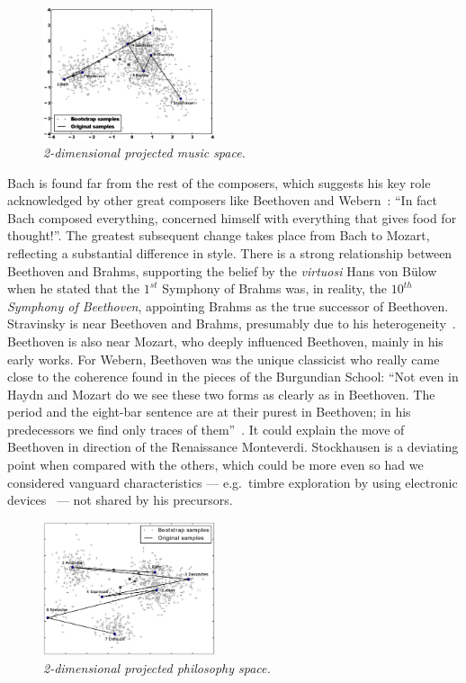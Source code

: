 \documentclass[
 aip,
 jmp,
 amsmath,amssymb,
 reprint,
]{revtex4-1}
\begin{document}
\begin{figure}[htbp]
  \begin{center}
    \includegraphics[width=0.45\textwidth]{g1}
  \end{center}
  \caption{\it 2-dimensional projected music space.}
  \label{fig:pcamus}
\end{figure}

Bach is found far from the rest of the composers, which suggests his
key role acknowledged by other great composers like Beethoven and
Webern~\cite{Webern}: ``In fact Bach composed everything, concerned
himself with everything that gives food for thought!''. The greatest
subsequent change takes place from Bach to Mozart, reflecting a
substantial difference in style. There is a strong relationship
between Beethoven and Brahms, supporting the belief by the
\textit{virtuosi} Hans von B\"{u}low~\cite{Bulow} when he stated that
the $1^{st}$ Symphony of Brahms was, in reality, the \textit{$10^{th}$
  Symphony of Beethoven}, appointing Brahms as the true successor of
Beethoven. Stravinsky is near Beethoven and Brahms, presumably due to
his heterogeneity~\cite{BennettHistory, Lovelock}. Beethoven is also
near Mozart, who deeply influenced Beethoven, mainly in his early
works. For Webern, Beethoven was the unique classicist who really came
close to the coherence found in the pieces of the Burgundian School:
``Not even in Haydn and Mozart do we see these two forms as clearly as
in Beethoven. The period and the eight-bar sentence are at their
purest in Beethoven; in his predecessors we find only traces of
them''~\cite{Webern}. It could explain the move of Beethoven in
direction of the Renaissance Monteverdi. Stockhausen is a deviating
point when compared with the others, which could be more even so had
we considered vanguard characteristics --- e.g.\ timbre exploration by
using electronic devices~\cite{Lovelock} --- not shared by his
precursors.

\begin{figure}
  \begin{center}
    \includegraphics[width=0.45\textwidth]{pca_filosofos_novo}
  \end{center}
  \caption{\it 2-dimensional projected philosophy space.}
  \label{fig:pcaphi}
\end{figure}
\end{document}
